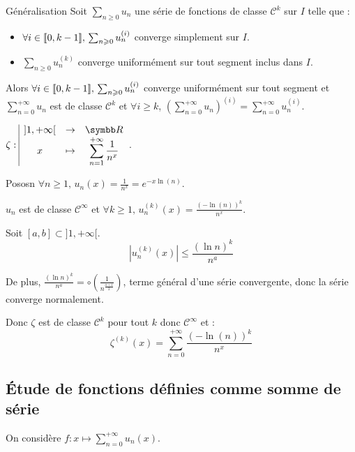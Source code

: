 \begin{theoreme}{Généralisation}{}
    Soit $\sum_{n \geqslant 0} u_n$ une série de fonctions de classe $\mathscr{C}^k$ sur $I$ telle que :
    \begin{itemize}
        \item $\forall i \in [\![0, k - 1]\!], \, \sum_{n \geqslant 0} u_n^{(i)}$ converge simplement sur $I$.
        \item $\sum_{n \geqslant 0} u_n^{(k)}$ converge uniformément sur tout segment inclus dans $I$.
    \end{itemize}

    Alors $\forall i \in [\![0, k - 1]\!], \, \sum_{n \geqslant 0} u_n^{(i)}$ converge uniformément sur tout segment
    et $\displaystyle \sum_{n = 0}^{+ \infty} u_n$ est de classe $\mathscr{C}^k$ et 
    $\forall i \geqslant k$, $\displaystyle \left( \sum_{n = 0}^{+ \infty} u_n \right)^{(i)} = \sum_{n = 0}^{+ \infty} u_n^{(i)}$.
\end{theoreme}

\begin{exemple}
    $\fonction \zeta {]1, + \infty[}{\R} x {\sum_{n = 1}^{+ \infty} \frac 1 {n^x}}$.

    Pososn $\forall n \geqslant 1, \, u_n(x) = \frac 1 {n^x} = e^{-x \ln(n)}$.

    $u_n$ est de classe $\mathscr {C}^{\infty}$ et $\forall k \geqslant 1, \, u_n^{(k)}(x) = \frac{(- \ln(n))^k}{n^x}$. 

    Soit $[a, b] \subset ]1, +\infty[$.
    \[\left| u_n^{(k)}(x) \right| \leqslant \frac{(\ln n )^k}{n^a}\]

    De plus, $\displaystyle \frac{(\ln n)^k}{n^a} = \circ \left( \frac 1 {n^{\frac{a + 1}{2}}} \right)$, terme 
    général d'une série convergente, donc la série converge normalement. 

    Donc $\zeta$ est de classe $\mathscr{C}^{k}$ pour tout $k$ donc $\mathscr{C}^{\infty}$ et :
    \[\zeta^{(k)}(x) = \sum_{n = 0}^{+ \infty} \frac{(- \ln(n))^k}{n^x}\]
\end{exemple}

\subsection{Étude de fonctions définies comme somme de série}

On considère $f : \displaystyle x \mapsto \sum_{n = 0}^{+ \infty} u_n(x)$. 

